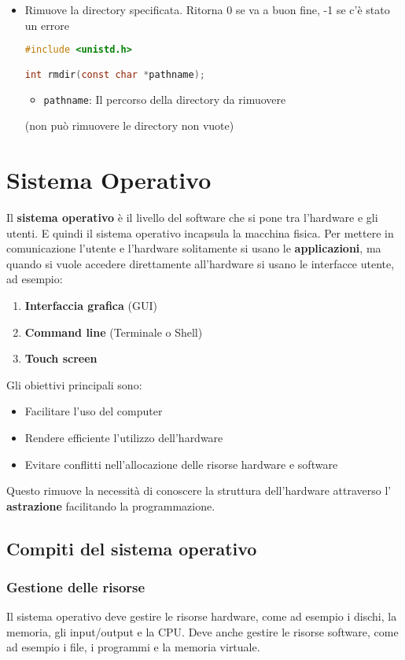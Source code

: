 \documentclass[a4paper]{article}
\begin{document}
\begin{itemize}
\item Rimuove la directory specificata. Ritorna 0 se va a buon fine, -1 se c'è stato
  un errore
\begin{lstlisting}[language=C]
#include <unistd.h>

int rmdir(const char *pathname);
\end{lstlisting}
  \begin{itemize}
    \item \texttt{pathname}: Il percorso della directory da rimuovere
  \end{itemize}
  (non può rimuovere le directory non vuote)

\end{itemize}


\section{Sistema Operativo}
Il \textbf{sistema operativo} è il livello del software che si pone tra l'hardware
e gli utenti. E quindi il sistema operativo incapsula la macchina fisica.
Per mettere in comunicazione l'utente e l'hardware solitamente si usano le 
\textbf{applicazioni}, ma quando si vuole accedere direttamente all'hardware
si usano le interfacce utente, ad esempio:
\begin{enumerate}
  \item \textbf{Interfaccia grafica} (GUI)
  \item \textbf{Command line} (Terminale o Shell)
  \item \textbf{Touch screen}
\end{enumerate}
\noindent
Gli obiettivi principali sono:
\begin{itemize}
  \item Facilitare l'uso del computer
  \item Rendere efficiente l'utilizzo dell'hardware
  \item Evitare conflitti nell'allocazione delle risorse hardware e software
\end{itemize}
Questo rimuove la necessità di conoscere la struttura dell'hardware attraverso l'
\textbf{astrazione} facilitando la programmazione.

\subsection{Compiti del sistema operativo}
\subsubsection{Gestione delle risorse}
Il sistema operativo deve gestire le risorse hardware, come ad esempio i dischi, la memoria,
gli input/output e la CPU. Deve anche gestire le risorse software, come ad esempio i file,
i programmi e la memoria virtuale.
\end{document}
